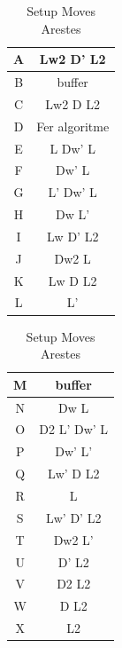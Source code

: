 \begin{table}[h]
    \begin{minipage}{.5\linewidth}
        \centering
        \begin{tabular}{|c|c|}
            \hline
            A & Lw2 D' L2     \\ 
            \hline
            B & buffer        \\ 
            \hline
            C & Lw2 D L2      \\
            \hline
            D & Fer algoritme \\ 
            \hline
            E & L Dw' L       \\ 
            \hline
            F & Dw' L         \\ 
            \hline
            G & L' Dw' L      \\ 
            \hline
            H & Dw L'         \\ 
            \hline
            I & Lw D' L2      \\ 
            \hline
            J & Dw2 L         \\ 
            \hline
            K & Lw D L2       \\ 
            \hline
            L & L'            \\ 
            \hline
        \end{tabular}
    \end{minipage}
    \begin{minipage}{.5\linewidth}
        \centering
        \begin{tabular}{|c|c|}
            \hline
            M & buffer        \\ 
            \hline
            N & Dw L          \\ 
            \hline
            O & D2 L' Dw' L   \\ 
            \hline
            P & Dw' L'        \\ 
            \hline
            Q & Lw' D L2      \\ 
            \hline
            R & L             \\ 
            \hline
            S & Lw' D' L2     \\ 
            \hline
            T & Dw2 L'        \\ 
            \hline
            U & D' L2         \\ 
            \hline
            V & D2 L2         \\ 
            \hline
            W & D L2          \\ 
            \hline
            X & L2            \\ 
            \hline
        \end{tabular}
    \end{minipage} 
    \caption{Setup Moves Arestes}
    \label{fig:setup-arestes}
\end{table}


